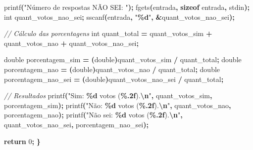 \documentclass[
  11pt,
  a4paper,
]{scrbook}
\newenvironment{Shaded}{\begin{snugshade}}{\end{snugshade}}
\newcommand{\CommentTok}[1]{\textcolor[rgb]{0.56,0.35,0.01}{\textit{#1}}}
\newcommand{\ControlFlowTok}[1]{\textcolor[rgb]{0.13,0.29,0.53}{\textbf{#1}}}
\newcommand{\DataTypeTok}[1]{\textcolor[rgb]{0.13,0.29,0.53}{#1}}
\newcommand{\DecValTok}[1]{\textcolor[rgb]{0.00,0.00,0.81}{#1}}
\newcommand{\KeywordTok}[1]{\textcolor[rgb]{0.13,0.29,0.53}{\textbf{#1}}}
\newcommand{\NormalTok}[1]{#1}
\newcommand{\OperatorTok}[1]{\textcolor[rgb]{0.81,0.36,0.00}{\textbf{#1}}}
\newcommand{\SpecialCharTok}[1]{\textcolor[rgb]{0.81,0.36,0.00}{\textbf{#1}}}
\newcommand{\StringTok}[1]{\textcolor[rgb]{0.31,0.60,0.02}{#1}}
\begin{document}
\begin{Shaded}
\begin{Highlighting}[]
\NormalTok{    printf}\OperatorTok{(}\StringTok{"Número de respostas NÃO SEI: "}\OperatorTok{);}
\NormalTok{    fgets}\OperatorTok{(}\NormalTok{entrada}\OperatorTok{,} \KeywordTok{sizeof}\NormalTok{ entrada}\OperatorTok{,}\NormalTok{ stdin}\OperatorTok{);}
    \DataTypeTok{int}\NormalTok{ quant\_votos\_nao\_sei}\OperatorTok{;}
\NormalTok{    sscanf}\OperatorTok{(}\NormalTok{entrada}\OperatorTok{,} \StringTok{"}\SpecialCharTok{\%d}\StringTok{"}\OperatorTok{,} \OperatorTok{\&}\NormalTok{quant\_votos\_nao\_sei}\OperatorTok{);}

    \CommentTok{// Cálculo das porcentagens}
    \DataTypeTok{int}\NormalTok{ quant\_total }\OperatorTok{=}\NormalTok{ quant\_votos\_sim }\OperatorTok{+}\NormalTok{ quant\_votos\_nao }\OperatorTok{+}\NormalTok{ quant\_votos\_nao\_sei}\OperatorTok{;}

    \DataTypeTok{double}\NormalTok{ porcentagem\_sim }\OperatorTok{=} \OperatorTok{(}\DataTypeTok{double}\OperatorTok{)}\NormalTok{quant\_votos\_sim }\OperatorTok{/}\NormalTok{ quant\_total}\OperatorTok{;}
    \DataTypeTok{double}\NormalTok{ porcentagem\_nao }\OperatorTok{=} \OperatorTok{(}\DataTypeTok{double}\OperatorTok{)}\NormalTok{quant\_votos\_nao }\OperatorTok{/}\NormalTok{ quant\_total}\OperatorTok{;}
    \DataTypeTok{double}\NormalTok{ porcentagem\_nao\_sei }\OperatorTok{=} \OperatorTok{(}\DataTypeTok{double}\OperatorTok{)}\NormalTok{quant\_votos\_nao\_sei }\OperatorTok{/}\NormalTok{ quant\_total}\OperatorTok{;}

    \CommentTok{// Resultados}
\NormalTok{    printf}\OperatorTok{(}\StringTok{"Sim: }\SpecialCharTok{\%d}\StringTok{ votos (}\SpecialCharTok{\%.2f}\StringTok{).}\SpecialCharTok{\textbackslash{}n}\StringTok{"}\OperatorTok{,}\NormalTok{ quant\_votos\_sim}\OperatorTok{,}\NormalTok{ porcentagem\_sim}\OperatorTok{);}
\NormalTok{    printf}\OperatorTok{(}\StringTok{"Não: }\SpecialCharTok{\%d}\StringTok{ votos (}\SpecialCharTok{\%.2f}\StringTok{).}\SpecialCharTok{\textbackslash{}n}\StringTok{"}\OperatorTok{,}\NormalTok{ quant\_votos\_nao}\OperatorTok{,}\NormalTok{ porcentagem\_nao}\OperatorTok{);}
\NormalTok{    printf}\OperatorTok{(}\StringTok{"Não sei: }\SpecialCharTok{\%d}\StringTok{ votos (}\SpecialCharTok{\%.2f}\StringTok{).}\SpecialCharTok{\textbackslash{}n}\StringTok{"}\OperatorTok{,}\NormalTok{ quant\_votos\_nao\_sei}\OperatorTok{,}
\NormalTok{           porcentagem\_nao\_sei}\OperatorTok{);}

    \ControlFlowTok{return} \DecValTok{0}\OperatorTok{;}
\OperatorTok{\}}
\end{Highlighting}
\end{Shaded}
\end{document}
